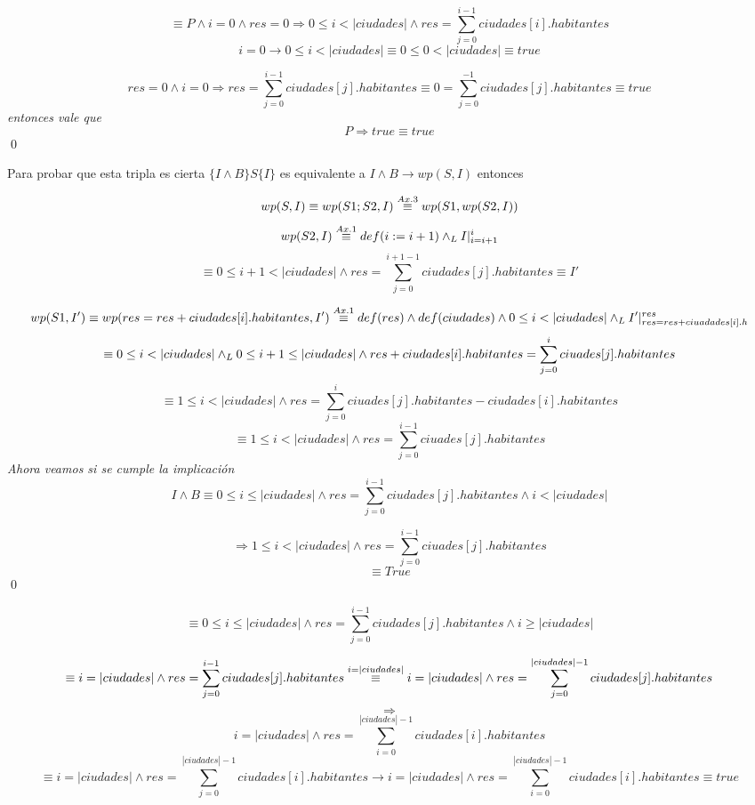 \documentclass[10pt,a4paper]{article}
\begin{document}
\begin{demoPc}
\begin{demo1}
	\[ 
	\equiv P \land i=0\land res=0 \Longrightarrow 0 \leq i < |ciudades| \land res=\sum_{j=0}^{i-1}ciudades[i].habitantes
	\]
	\[i=0 \to 0 \leq i <|ciudades| \equiv 0 \leq 0 < |ciudades| \equiv true\]
	
	\[res=0 \land i=0\Longrightarrow res= \sum_{j=0}^{i-1} ciudades[j].habitantes \equiv 0 = \sum_{j=0}^{-1} ciudades[j].habitantes \equiv true \]
	\textit{entonces vale que}
		\[P \Longrightarrow true \equiv true \]
	\qed \\
	
\end{demo1}


\begin{demo2}
Para probar que esta tripla es cierta $\{I \land B\}S\{I\}$  es equivalente a $I \land B \to wp(S,I)$ entonces\par
	\[
		wp(S,I) \equiv wp(S1;S2,I) \overset{\scriptsize Ax. 3}{\equiv}wp(S1,wp(S2,I))
	\]
	\[ 	wp(S2,I) \overset{\scriptsize Ax. 1}{\equiv} def(i:=i+1) \land _L I|_{i=i+1}^{i}
	\]	
	\[ \equiv 0\leq i+1 <|ciudades| \land res=\sum_{j=0}^{i+1-1} ciudades[j].habitantes  \equiv I' \]\par
	
	\[wp(S1,I') \equiv wp(res=res+ciudades[i].habitantes,I')\overset{\scriptsize Ax. 1}{\equiv} def(res) \land def(ciudades) \land 0 \leq i < |ciudades| \land _L I'|_{res=res+ciuadades[i].h}^{res}\]
	\[
	\equiv 0 \leq i <|ciudades| \yLuego 0\leq i+1 \leq |ciudades|\land res+ ciudades[i].habitantes=\sum_{j=0}^{i} ciuades[j].habitantes
	\]
	\[\equiv 1 \leq i < |ciudades| \land res=\sum_{j=0}^{i} ciuades[j].habitantes -ciudades[i].habitantes \]
	\[
	\boxed{	\equiv 1 \leq i < |ciudades| \land res=\sum_{j=0}^{i-1} ciuades[j].habitantes }
	\]
	\textit{Ahora veamos si se cumple la implicación}
	\[
		 I \land B \equiv 0 \leq i \leq |ciudades| \land res= \sum_{j=0}^{i-1} ciudades[j].habitantes \land  i < \lvert ciudades \rvert 
	\]

	\[ \Longrightarrow 1 \leq i < |ciudades| \land res=\sum_{j=0}^{i-1} ciuades[j].habitantes \]
	\[\equiv True\]
		\qed 

\end{demo2}
\begin{demo3}
	\[
	\equiv 0 \leq i \leq \lvert ciudades\rvert \land  res=  \sum_{j=0}^{i-1} ciudades[j].habitantes \land i \geq |ciudades| 
	\]
	
	\[\equiv i=|ciudades| \land  res=\sum_{j=0}^{i-1} ciudades[j].habitantes \overset{{\tiny i= |ciudades|}}{\equiv} i=|ciudades| \land  res=\sum_{j=0}^{|ciudades|-1} ciudades[j].habitantes
	\]
	\[\Longrightarrow\]
	\[i = |ciudades| \land res=\sum_{i=0}^{|ciudades|-1} ciudades[i].habitantes
	\]
	\[\equiv i = |ciudades| \land res=\sum_{j=0}^{|ciudades|-1} ciudades[i].habitantes \to i = |ciudades| \land res=\sum_{i=0}^{|ciudades|-1} ciudades[i].habitantes \equiv true\]



\end{demo3}
\end{demoPc}
\end{document}
